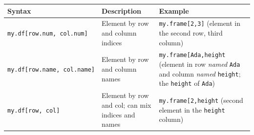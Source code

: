 \documentclass[]{book}
\theoremstyle{definition}
\theoremstyle{definition}
\theoremstyle{remark}
\begin{document}
\begin{longtable}[]{@{}lll@{}}
\toprule
\begin{minipage}[b]{0.28\columnwidth}\raggedright\strut
Syntax\strut
\end{minipage} & \begin{minipage}[b]{0.27\columnwidth}\raggedright\strut
Description\strut
\end{minipage} & \begin{minipage}[b]{0.37\columnwidth}\raggedright\strut
Example\strut
\end{minipage}\tabularnewline
\midrule
\endhead
\begin{minipage}[t]{0.28\columnwidth}\raggedright\strut
\texttt{my.df{[}row.num,\ col.num{]}}\strut
\end{minipage} & \begin{minipage}[t]{0.27\columnwidth}\raggedright\strut
Element by row and column indices\strut
\end{minipage} & \begin{minipage}[t]{0.37\columnwidth}\raggedright\strut
\texttt{my.frame{[}2,3{]}} (element in the second row, third
column)\strut
\end{minipage}\tabularnewline
\begin{minipage}[t]{0.28\columnwidth}\raggedright\strut
\texttt{my.df{[}row.name,\ col.name{]}}\strut
\end{minipage} & \begin{minipage}[t]{0.27\columnwidth}\raggedright\strut
Element by row and column names\strut
\end{minipage} & \begin{minipage}[t]{0.37\columnwidth}\raggedright\strut
\texttt{my.frame{[}\textquotesingle{}Ada\textquotesingle{},\textquotesingle{}height\textquotesingle{}{]}}
(element in row \emph{named} \texttt{Ada} and column \emph{named}
\texttt{height}; the \texttt{height} of \texttt{Ada})\strut
\end{minipage}\tabularnewline
\begin{minipage}[t]{0.28\columnwidth}\raggedright\strut
\texttt{my.df{[}row,\ col{]}}\strut
\end{minipage} & \begin{minipage}[t]{0.27\columnwidth}\raggedright\strut
Element by row and col; can mix indices and names\strut
\end{minipage} & \begin{minipage}[t]{0.37\columnwidth}\raggedright\strut
\texttt{my.frame{[}2,\textquotesingle{}height\textquotesingle{}{]}}
(second element in the \texttt{height} column)\strut

\end{minipage}
\end{longtable}
\end{document}
